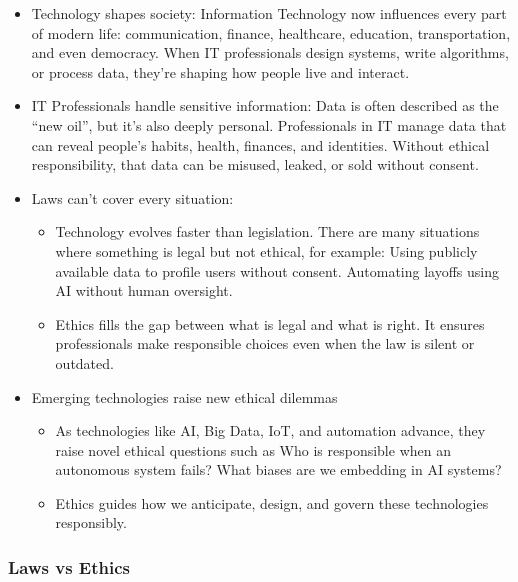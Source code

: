 \begin{itemize}
    \item Technology shapes society: Information Technology now influences every part of modern life: communication, finance, healthcare, education, transportation, and even democracy. When IT professionals design systems, write algorithms, or process data, they’re shaping how people live and interact.
    \item IT Professionals handle sensitive information: Data is often described as the “new oil”, but it’s also deeply personal. Professionals in IT manage data that can reveal people’s habits, health, finances, and identities. Without ethical responsibility, that data can be misused, leaked, or sold without consent.
    \item Laws can't cover every situation: 
        \begin{itemize}
            \item Technology evolves faster than legislation. There are many situations where something is legal but not ethical, for example: Using publicly available data to profile users without consent. Automating layoffs using AI without human oversight.
            \item Ethics fills the gap between what is legal and what is right. It ensures professionals make responsible choices even when the law is silent or outdated.
        \end{itemize}
    \item Emerging technologies raise new ethical dilemmas
        \begin{itemize}
            \item As technologies like AI, Big Data, IoT, and automation advance, they raise novel ethical questions such as Who is responsible when an autonomous system fails? What biases are we embedding in AI systems?
            \item Ethics guides how we anticipate, design, and govern these technologies responsibly.
        \end{itemize}
\end{itemize}

\subsubsection{Laws vs Ethics}

